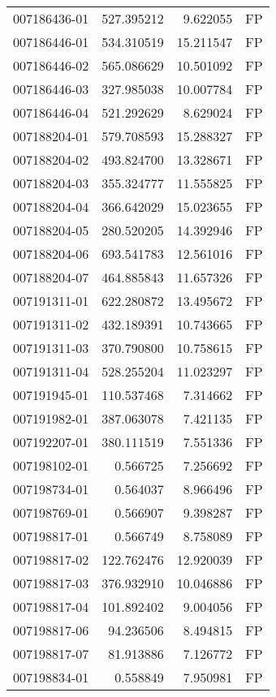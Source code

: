 \begin{tabular}{lrrl}
007186436-01 &  527.395212 &     9.622055 &   FP \\
007186446-01 &  534.310519 &    15.211547 &   FP \\
007186446-02 &  565.086629 &    10.501092 &   FP \\
007186446-03 &  327.985038 &    10.007784 &   FP \\
007186446-04 &  521.292629 &     8.629024 &   FP \\
007188204-01 &  579.708593 &    15.288327 &   FP \\
007188204-02 &  493.824700 &    13.328671 &   FP \\
007188204-03 &  355.324777 &    11.555825 &   FP \\
007188204-04 &  366.642029 &    15.023655 &   FP \\
007188204-05 &  280.520205 &    14.392946 &   FP \\
007188204-06 &  693.541783 &    12.561016 &   FP \\
007188204-07 &  464.885843 &    11.657326 &   FP \\
007191311-01 &  622.280872 &    13.495672 &   FP \\
007191311-02 &  432.189391 &    10.743665 &   FP \\
007191311-03 &  370.790800 &    10.758615 &   FP \\
007191311-04 &  528.255204 &    11.023297 &   FP \\
007191945-01 &  110.537468 &     7.314662 &   FP \\
007191982-01 &  387.063078 &     7.421135 &   FP \\
007192207-01 &  380.111519 &     7.551336 &   FP \\
007198102-01 &    0.566725 &     7.256692 &   FP \\
007198734-01 &    0.564037 &     8.966496 &   FP \\
007198769-01 &    0.566907 &     9.398287 &   FP \\
007198817-01 &    0.566749 &     8.758089 &   FP \\
007198817-02 &  122.762476 &    12.920039 &   FP \\
007198817-03 &  376.932910 &    10.046886 &   FP \\
007198817-04 &  101.892402 &     9.004056 &   FP \\
007198817-06 &   94.236506 &     8.494815 &   FP \\
007198817-07 &   81.913886 &     7.126772 &   FP \\
007198834-01 &    0.558849 &     7.950981 &   FP \\

\end{tabular}
